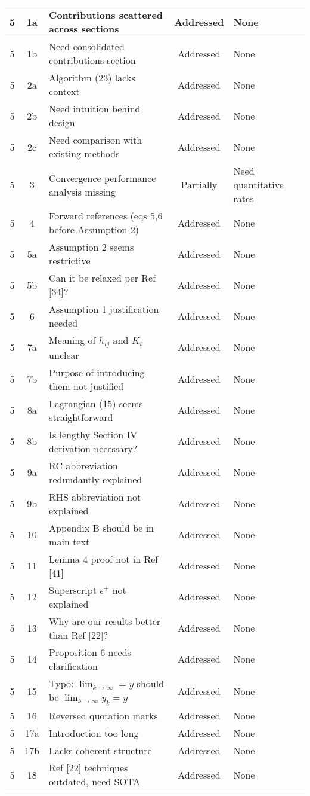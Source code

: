 \documentclass{article}
\begin{document}
\begin{longtable}{|c|c|p{5cm}|c|p{4cm}|}
5 & 1a & Contributions scattered across sections & Addressed & None \\
\hline
5 & 1b & Need consolidated contributions section & Addressed & None \\
\hline
5 & 2a & Algorithm (23) lacks context & Addressed & None \\
\hline
5 & 2b & Need intuition behind design & Addressed & None \\
\hline
5 & 2c & Need comparison with existing methods & Addressed & None \\
\hline
5 & 3 & Convergence performance analysis missing & Partially & Need quantitative rates \\
\hline
5 & 4 & Forward references (eqs 5,6 before Assumption 2) & Addressed & None \\
\hline
5 & 5a & Assumption 2 seems restrictive & Addressed & None \\
\hline
5 & 5b & Can it be relaxed per Ref [34]? & Addressed & None \\
\hline
5 & 6 & Assumption 1 justification needed & Addressed & None \\
\hline
5 & 7a & Meaning of $h_{ij}$ and $K_i$ unclear & Addressed & None \\
\hline
5 & 7b & Purpose of introducing them not justified & Addressed & None \\
\hline
5 & 8a & Lagrangian (15) seems straightforward & Addressed & None \\
\hline
5 & 8b & Is lengthy Section IV derivation necessary? & Addressed & None \\
\hline
5 & 9a & RC abbreviation redundantly explained & Addressed & None \\
\hline
5 & 9b & RHS abbreviation not explained & Addressed & None \\
\hline
5 & 10 & Appendix B should be in main text & Addressed & None \\
\hline
5 & 11 & Lemma 4 proof not in Ref [41] & Addressed & None \\
\hline
5 & 12 & Superscript $\epsilon^+$ not explained & Addressed & None \\
\hline
5 & 13 & Why are our results better than Ref [22]? & Addressed & None \\
\hline
5 & 14 & Proposition 6 needs clarification & Addressed & None \\
\hline
5 & 15 & Typo: $\lim_{k\to\infty}=y$ should be $\lim_{k\to\infty}y_k=y$ & Addressed & None \\
\hline
5 & 16 & Reversed quotation marks & Addressed & None \\
\hline
5 & 17a & Introduction too long & Addressed & None \\
\hline
5 & 17b & Lacks coherent structure & Addressed & None \\
\hline
5 & 18 & Ref [22] techniques outdated, need SOTA & Addressed & None \\
\hline


\end{longtable}
\end{document}
